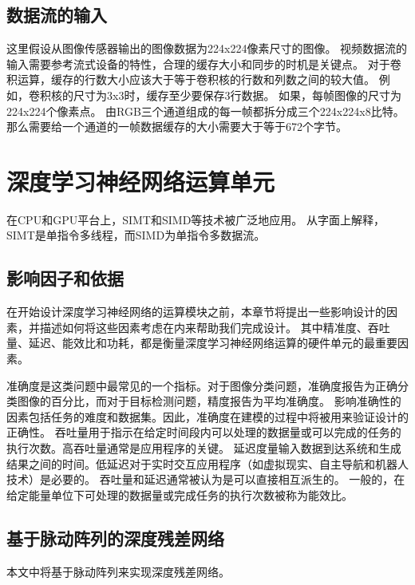 \subsection{数据流的输入}

这里假设从图像传感器输出的图像数据为224x224像素尺寸的图像。
视频数据流的输入需要参考流式设备的特性，合理的缓存大小和同步的时机是关键点。
对于卷积运算，缓存的行数大小应该大于等于卷积核的行数和列数之间的较大值。
例如，卷积核的尺寸为3x3时，缓存至少要保存3行数据。
如果，每帧图像的尺寸为224x224个像素点。
由RGB三个通道组成的每一帧都拆分成三个224x224x8比特。
那么需要给一个通道的一帧数据缓存的大小需要大于等于672个字节。


\section{深度学习神经网络运算单元}


在CPU和GPU平台上，SIMT和SIMD等技术被广泛地应用。
从字面上解释，SIMT是单指令多线程，而SIMD为单指令多数据流。


\subsection{影响因子和依据}
在开始设计深度学习神经网络的运算模块之前，本章节将提出一些影响设计的因素，并描述如何将这些因素考虑在内来帮助我们完成设计。
其中精准度、吞吐量、延迟、能效比和功耗，都是衡量深度学习神经网络运算的硬件单元的最重要因素。


准确度是这类问题中最常见的一个指标。对于图像分类问题，准确度报告为正确分类图像的百分比，而对于目标检测问题，精度报告为平均准确度。
影响准确性的因素包括任务的难度和数据集。因此，准确度在建模的过程中将被用来验证设计的正确性。
吞吐量用于指示在给定时间段内可以处理的数据量或可以完成的任务的执行次数。高吞吐量通常是应用程序的关键。
延迟度量输入数据到达系统和生成结果之间的时间。低延迟对于实时交互应用程序（如虚拟现实、自主导航和机器人技术）是必要的。
吞吐量和延迟通常被认为是可以直接相互派生的。
一般的，在给定能量单位下可处理的数据量或完成任务的执行次数被称为能效比。




\subsection{基于脉动阵列的深度残差网络}
本文中将基于脉动阵列来实现深度残差网络。

